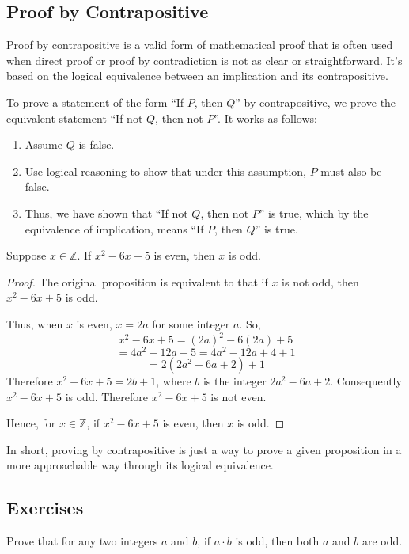 \documentclass[
	12pt, %
	fleqn, %
	a4paper, %
]{LegrandOrangeBook}
\begin{document}
\subsection{Proof by Contrapositive} \label{contrapos}
Proof by contrapositive is a valid form of mathematical proof that is often used when direct proof or proof by contradiction is not as clear or straightforward. It's based on the logical equivalence between an implication and its contrapositive.

To prove a statement of the form “If \(P\), then \(Q\)” by contrapositive, we prove the equivalent statement “If not \(Q\), then not \(P\)”. It works as follows:

\begin{enumerate}
    \item Assume \(Q\) is false.
    \item Use logical reasoning to show that under this assumption, \(P\) must also be false.
    \item Thus, we have shown that “If not \(Q\), then not \(P\)” is true, which by the equivalence of implication, means “If \(P\), then \(Q\)” is true.
\end{enumerate}

\begin{example}
Suppose \( x \in \mathbb{Z} \). If \( x^2 - 6x + 5 \) is even, then \( x \) is odd.
\end{example}

\begin{proof}
The original proposition is equivalent to that if \( x \) is not odd, then \( x^2 - 6x + 5 \) is odd. 

Thus, when \( x \) is even,  \( x = 2a \) for some integer \( a \). So, $$x^2 - 6x + 5 = (2a)^2 - 6(2a) + 5$$  $$= 4a^2 - 12a + 5 = 4a^2 - 12a + 4 + 1$$ $$= 2(2a^2 - 6a + 2) + 1$$ Therefore \( x^2 - 6x + 5 = 2b + 1 \), where \( b \) is the integer \( 2a^2 - 6a + 2 \). Consequently \( x^2 - 6x + 5 \) is odd. Therefore \( x^2 - 6x + 5 \) is not even.

Hence, for \( x \in \mathbb{Z} \), if \( x^2 - 6x + 5 \) is even, then \( x \) is odd.
\end{proof}
\begin{remark}
    In short, proving by contrapositive is just a way to prove a given proposition in a more approachable way through its logical equivalence.
\end{remark}
\subsection{Exercises}
\begin{exercise}
Prove that for any two integers \( a \) and \( b \), if \( a \cdot b \) is odd, then both \( a \) and \( b \) are odd.
\end{exercise}
\end{document}
